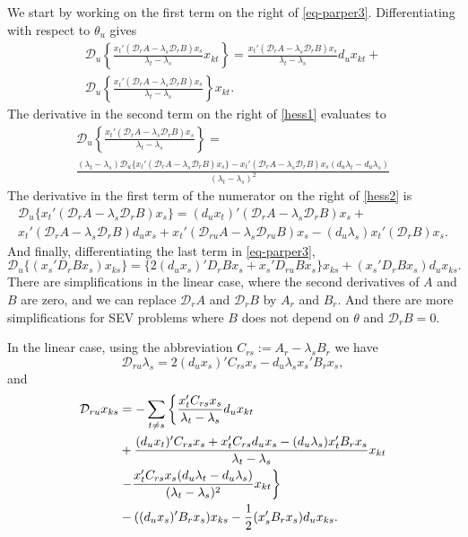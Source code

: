 \documentclass[
  12pt,
  letterpaper,
  DIV=11,
  numbers=noendperiod]{scrartcl}
\begin{document}
We start by working on the first term on the right of
\eqref{eq-parper3}. Differentiating with respect to \(\theta_u\) gives
\begin{multline}
\mathcal{D}_{u}\left\{\frac{x_t'(\mathcal{D}_rA-\lambda_s\mathcal{D}_rB)x_s}{\lambda_t-\lambda_s}x_{kt}\right\}=\frac{x_t'(\mathcal{D}_rA-\lambda_s\mathcal{D}_rB)x_s}{\lambda_t-\lambda_s}d_ux_{kt}+
\\\mathcal{D}_{u}\left\{\frac{x_t'(\mathcal{D}_rA-\lambda_s\mathcal{D}_rB)x_s}{\lambda_t-\lambda_s}\right\}x_{kt}.\label{hess1}
\end{multline} The derivative in the second term on the right of
\eqref{hess1} evaluates to \begin{multline}
\mathcal{D}_{u}\left\{\frac{x_t'(\mathcal{D}_rA-\lambda_s\mathcal{D}_rB)x_s}{\lambda_t-\lambda_s}\right\}=\\
\frac{(\lambda_t-\lambda_s)\mathcal{D}_u\{x_t'(\mathcal{D}_rA-\lambda_s\mathcal{D}_rB)x_s\}-x_t'(\mathcal{D}_rA-\lambda_s\mathcal{D}_rB)x_s(d_u\lambda_t-d_u\lambda_s)}{(\lambda_t-\lambda_s)^2}\label{hess2}
\end{multline} The derivative in the first term of the numerator on the
right of \eqref{hess2} is \begin{multline}
\mathcal{D}_u\{x_t'(\mathcal{D}_rA-\lambda_s\mathcal{D}_rB)x_s\}=
(d_ux_t)'(\mathcal{D}_rA-\lambda_s\mathcal{D}_rB)x_s+\\
x_t'(\mathcal{D}_rA-\lambda_s\mathcal{D}_rB)d_ux_s+
x_t'(\mathcal{D}_{ru}A-\lambda_s\mathcal{D}_{ru}B)x_s-(d_u\lambda_s)x_t'(\mathcal{D}_rB)x_s.
\label{hess3}\end{multline} And finally, differentiating the last term
in \eqref{eq-parper3}, \begin{equation}
\mathcal{D}_u\{(x_s'D_rBx_s)x_{ks}\}=\{2(d_ux_s)'D_rBx_s+x_s'D_{ru}Bx_s\}x_{ks}+(x_s'D_rBx_s)d_ux_{ks}.
\end{equation} There are simplifications in the linear case, where the
second derivatives of \(A\) and \(B\) are zero, and we can replace
\(\mathcal{D}_rA\) and \(\mathcal{D}_rB\) by \(A_r\) and \(B_r\). And
there are more simplifications for SEV problems where \(B\) does not
depend on \(\theta\) and \(\mathcal{D}_rB=0\).

In the linear case, using the abbreviation \(C_{rs}:=A_r-\lambda_sB_r\)
we have \begin{equation}
\mathcal{D}_{ru}\lambda_s=2(d_ux_s)'C_{rs}x_s-d_u\lambda_sx_s'B_rx_s,
\end{equation} and \begin{align}
\mathcal{D}_{ru}x_{ks}&=-\sum_{t\not= s}\left\{\frac{x_t'C_{rs}x_s}{\lambda_t-\lambda_s}d_ux_{kt}\right.\notag\\
&+\frac{(d_ux_t)'C_{rs}x_s+
x_t'C_{rs}d_ux_s-(d_u\lambda_s)x_t'B_rx_s}{\lambda_t-\lambda_s}x_{kt}\notag\\
&\left.-\frac{x_t'C_{rs}x_s(d_u\lambda_t-d_u\lambda_s)}{(\lambda_t-\lambda_s)^2}x_{kt}\right\}\notag\\
&-((d_ux_s)'B_rx_s)x_{ks}-\frac12(x_s'B_rx_s)d_ux_{ks}.
\end{align}
\end{document}

